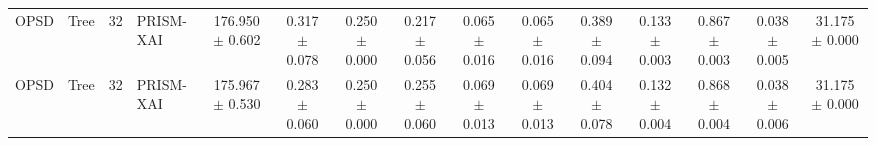 \begin{table}[t]
\begin{tabular}{llllccccccccccc}
OPSD & Tree & 32 & PRISM-XAI & 176.950 $\pm$ 0.602 & 0.317 $\pm$ 0.078 & 0.250 $\pm$ 0.000 & 0.217 $\pm$ 0.056 & 0.065 $\pm$ 0.016 & 0.065 $\pm$ 0.016 & 0.389 $\pm$ 0.094 & 0.133 $\pm$ 0.003 & 0.867 $\pm$ 0.003 & 0.038 $\pm$ 0.005 & 31.175 $\pm$ 0.000 \\
OPSD & Tree & 32 & PRISM-XAI & 175.967 $\pm$ 0.530 & 0.283 $\pm$ 0.060 & 0.250 $\pm$ 0.000 & 0.255 $\pm$ 0.060 & 0.069 $\pm$ 0.013 & 0.069 $\pm$ 0.013 & 0.404 $\pm$ 0.078 & 0.132 $\pm$ 0.004 & 0.868 $\pm$ 0.004 & 0.038 $\pm$ 0.006 & 31.175 $\pm$ 0.000 \\
\bottomrule
\end{tabular}
\end{table}
